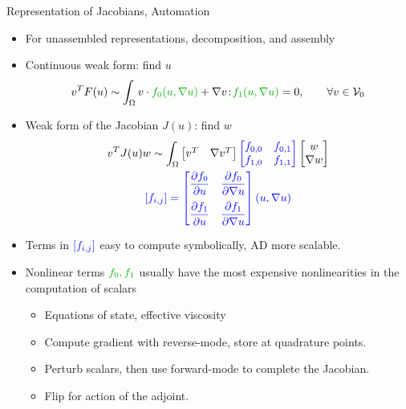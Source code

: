 \begin{frame}[shrink=5]{Representation of Jacobians, Automation}
  \begin{itemize}
  \item For unassembled representations, decomposition, and assembly
  \item Continuous weak form: find $u$
    \[ v^T F(u) \sim \int_\Omega v \cdot {\color{green!70!black} f_0(u,\nabla u)}
    + \nabla v \tcolon {\color{green!70!black} f_1(u,\nabla u)} = 0, \qquad \forall v \in \VV_0 \]
  \item Weak form of the Jacobian $J(u)$: find $w$
    \begin{gather*}
      v^T J(u) w \sim \int_\Omega \begin{bmatrix} v^T & \nabla v^T \end{bmatrix}
      {\color{blue} \begin{bmatrix} f_{0,0} & f_{0,1} \\ f_{1,0} & f_{1,1} \end{bmatrix}}
      \begin{bmatrix} w \\ \nabla w \end{bmatrix} \\
      {\color{blue} [f_{i,j}] = \begin{bmatrix} \dfrac{\partial f_0}{\partial u} & \dfrac{\partial f_0}{\partial \nabla u} \\[1em]
          \dfrac{\partial f_1}{\partial u} & \dfrac{\partial f_1}{\partial \nabla u} \end{bmatrix} (u,\nabla u) }
    \end{gather*}
  \item Terms in ${\color{blue} [f_{i,j}]}$ easy to compute symbolically, AD more scalable.
  \item Nonlinear terms ${\color{green!70!black}f_0,f_1}$ usually have the most expensive nonlinearities in the computation of scalars
    \begin{itemize}
    \item Equations of state, effective viscosity
    \item Compute gradient with reverse-mode, store at quadrature points.
    \item Perturb scalars, then use forward-mode to complete the Jacobian.
    \item Flip for action of the adjoint.
    \end{itemize}
  \end{itemize}
\end{frame}
